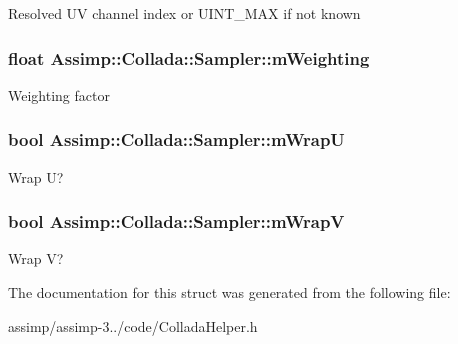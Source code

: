 Resolved U\+V channel index or U\+I\+N\+T\+\_\+\+M\+A\+X if not known \hypertarget{struct_assimp_1_1_collada_1_1_sampler_a1e2084411b2e95819be8a7e9a9a01318}{
\subsubsection[{m\+Weighting}]{\setlength{\rightskip}{0pt plus 5cm}float Assimp\+::\+Collada\+::\+Sampler\+::m\+Weighting}}\label{struct_assimp_1_1_collada_1_1_sampler_a1e2084411b2e95819be8a7e9a9a01318}
Weighting factor \hypertarget{struct_assimp_1_1_collada_1_1_sampler_ae0c316a46adf403a8db3093765cfbec0}{
\subsubsection[{m\+Wrap\+U}]{\setlength{\rightskip}{0pt plus 5cm}bool Assimp\+::\+Collada\+::\+Sampler\+::m\+Wrap\+U}}\label{struct_assimp_1_1_collada_1_1_sampler_ae0c316a46adf403a8db3093765cfbec0}
Wrap U? \hypertarget{struct_assimp_1_1_collada_1_1_sampler_a5a73db040dbc276c3ce0c177b1d1297e}{
\subsubsection[{m\+Wrap\+V}]{\setlength{\rightskip}{0pt plus 5cm}bool Assimp\+::\+Collada\+::\+Sampler\+::m\+Wrap\+V}}\label{struct_assimp_1_1_collada_1_1_sampler_a5a73db040dbc276c3ce0c177b1d1297e}
Wrap V? 

The documentation for this struct was generated from the following file\+:\begin{DoxyCompactItemize}
\item 
assimp/assimp-\/3../code/Collada\+Helper.\+h\end{DoxyCompactItemize}

